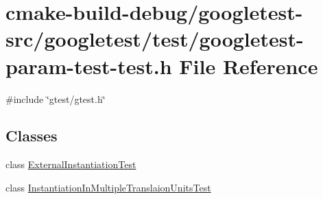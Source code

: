 \hypertarget{googletest-param-test-test_8h}{}\section{cmake-\/build-\/debug/googletest-\/src/googletest/test/googletest-\/param-\/test-\/test.h File Reference}
\label{googletest-param-test-test_8h}
{\ttfamily \#include \char`\"{}gtest/gtest.\+h\char`\"{}}\newline
\subsection*{Classes}
\begin{DoxyCompactItemize}
\item 
class \mbox{\hyperlink{classExternalInstantiationTest}{External\+Instantiation\+Test}}
\item 
class \mbox{\hyperlink{classInstantiationInMultipleTranslaionUnitsTest}{Instantiation\+In\+Multiple\+Translaion\+Units\+Test}}
\end{DoxyCompactItemize}
